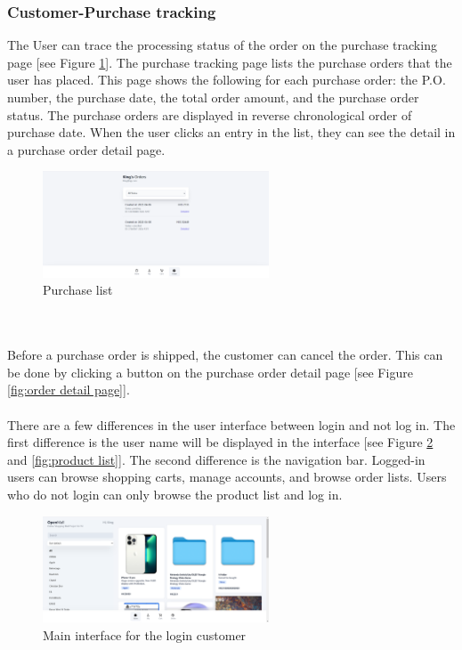 \documentclass{article}
\begin{document}
\subsubsection{Customer-Purchase tracking}
The User can trace the processing status of the order on the purchase tracking page [see Figure \ref{fig:purchase list}]. The purchase tracking page lists the purchase orders that the user has placed. This page shows the following for each purchase order: the P.O. number, the purchase date, the total order amount, and the purchase order status. The purchase orders are displayed in reverse chronological order of purchase date. When the user clicks an entry in the list, they can see the detail in a purchase order detail page.
\begin{figure}[!htp]
    \centering
    \includegraphics[width=0.6\textwidth]{purchase list.png}
    \caption{\label{fig:purchase list} Purchase list}
\end{figure}
\\\\
Before a purchase order is shipped, the customer can cancel the order. This can be done by clicking a button on the purchase order detail page [see Figure \ref{fig:order detail page}].
\\\\
There are a few differences in the user interface between login and not log in. The first difference is the user name will be displayed in the interface [see Figure \ref{fig:logined product list } and \ref{fig:product list}]. The second difference is the navigation bar. Logged-in users can browse shopping carts, manage accounts, and browse order lists. Users who do not login can only browse the product list and log in.
\begin{figure}[!htp]
    \centering
    \includegraphics[width=0.6\textwidth]{logined product list.png}
    \caption{\label{fig:logined product list }Main interface for the login customer}
\end{figure}
\end{document}
